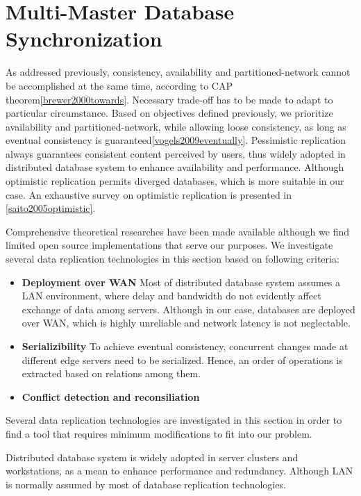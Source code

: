 
\section{Multi-Master Database Synchronization} \label{database_sync}
As addressed previously, consistency, availability and partitioned-network cannot be accomplished at the same time, according to CAP theorem\ref{brewer2000towards}. Necessary trade-off has to be made to adapt to particular circumstance. Based on objectives defined previously, we prioritize availability and partitioned-network, while allowing loose consistency, as long as eventual consistency is guaranteed\ref{vogels2009eventually}. Pessimistic replication always guarantees consistent content perceived by users, thus widely adopted in distributed database system to enhance availability and performance. Although optimistic replication permits diverged databases, which is more suitable in our case. An exhaustive survey on optimistic replication is presented in \ref{saito2005optimistic}.

Comprehensive theoretical researches have been made available although we find limited open source implementations that serve our purposes. We investigate several data replication technologies in this section based on following criteria:
\begin{itemize}
\item \textbf{Deployment over WAN}
Most of distributed database system assumes a LAN environment, where delay and bandwidth do not evidently affect exchange of data among servers. Although in our case, databases are deployed over WAN, which is highly unreliable and network latency is not neglectable.

\item \textbf{Serializibility}
To achieve eventual consistency, concurrent changes made at different edge servers need to be serialized. Hence, an order of operations is extracted based on relations among them.

\item \textbf{Conflict detection and reconsiliation}
\end{itemize}

 Several data replication technologies are investigated in this section in order to find a tool that requires minimum modifications to fit into our problem.

Distributed database system is widely adopted in server clusters and workstations, as a mean to enhance performance and redundancy. Although LAN is normally assumed by most of database replication technologies. 






